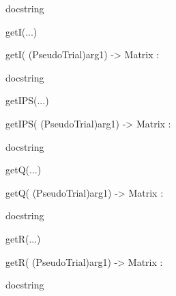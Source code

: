 \documentclass[letterpaper,10pt,english]{sphinxmanual}
\begin{document}
\begin{description}
\begin{description}
\begin{DUlineblock}{0em}
\begin{DUlineblock}{\DUlineblockindent}
\begin{DUlineblock}{\DUlineblockindent}
\item[] docstring
\item[] 
\end{DUlineblock}
\end{DUlineblock}
\item[] getI(...)
\item[]
\begin{DUlineblock}{\DUlineblockindent}
\item[] getI( (PseudoTrial)arg1) -\textgreater{} Matrix :
\item[]
\begin{DUlineblock}{\DUlineblockindent}
\item[] docstring
\item[] 
\end{DUlineblock}
\end{DUlineblock}
\item[] getIPS(...)
\item[]
\begin{DUlineblock}{\DUlineblockindent}
\item[] getIPS( (PseudoTrial)arg1) -\textgreater{} Matrix :
\item[]
\begin{DUlineblock}{\DUlineblockindent}
\item[] docstring
\item[] 
\end{DUlineblock}
\end{DUlineblock}
\item[] getQ(...)
\item[]
\begin{DUlineblock}{\DUlineblockindent}
\item[] getQ( (PseudoTrial)arg1) -\textgreater{} Matrix :
\item[]
\begin{DUlineblock}{\DUlineblockindent}
\item[] docstring
\item[] 
\end{DUlineblock}
\end{DUlineblock}
\item[] getR(...)
\item[]
\begin{DUlineblock}{\DUlineblockindent}
\item[] getR( (PseudoTrial)arg1) -\textgreater{} Matrix :
\item[]
\begin{DUlineblock}{\DUlineblockindent}
\item[] docstring

\end{DUlineblock}
\end{DUlineblock}
\end{DUlineblock}
\end{description}
\end{description}
\end{document}
